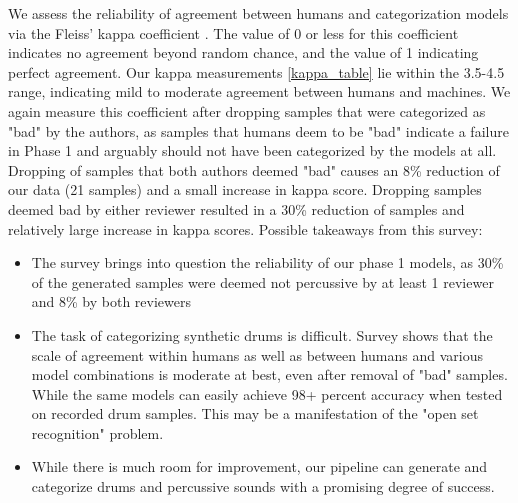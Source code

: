 \documentclass[\main/thesis.tex]{subfiles}
\begin{document}
We assess the reliability of agreement between humans and categorization models via the Fleiss' kappa coefficient \cite{fleiss1971measuring}. The value of 0 or less for this coefficient indicates no agreement beyond random chance, and the value of 1 indicating perfect agreement. Our kappa measurements \ref{kappa_table} lie within the 3.5-4.5 range, indicating mild to moderate agreement between humans and machines. We again measure this coefficient after dropping samples that were categorized as "bad" by the authors, as samples that humans deem to be "bad" indicate a failure in Phase 1 and arguably should not have been categorized by the models at all. Dropping of samples that both authors deemed "bad" causes an 8\% reduction of our data (21 samples) and a small increase in kappa score. Dropping samples deemed bad by either reviewer resulted in a 30\% reduction of samples and relatively large increase in kappa scores. 
Possible takeaways from this survey:
\begin{itemize}
    \item The survey brings into question the reliability of our phase 1 models, as 30\% of the generated samples were deemed not percussive by at least 1 reviewer and 8\% by both reviewers
    \item The task of categorizing synthetic drums is difficult. Survey shows that the scale of agreement within humans as well as between humans and various model combinations is moderate at best, even after removal of "bad" samples.  While the same models can easily achieve 98+ percent accuracy when tested on recorded drum samples. This may be a manifestation of the "open set recognition" problem. 
    \item While there is much room for improvement, our pipeline can generate and categorize drums and percussive sounds with a promising degree of success. 
\end{itemize}
\begin{center}

\begin{table}
\caption{\label{kappa_table}Table of Fleiss' kappa coefficient to measure the degree of agreement between humans (HvH), humans with FC model (H+FC), humans with CNNLSTM model, humans with all models (H+ALL), and the 3 models }
\end{table}
\end{center}
\end{document}
